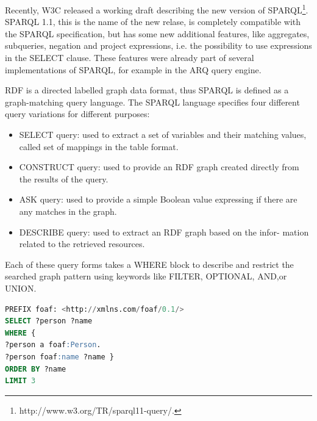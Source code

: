 Recently, W3C released a working draft describing the new version of SPARQL\footnote{http://www.w3.org/TR/sparql11-query/.}. SPARQL 1.1, this is the name of the new relase, is completely compatible with the SPARQL specification, but has some new additional features, like aggregates, subqueries, negation and project expressions, i.e. the possibility to use expressions in the SELECT clause. These features were already part of several implementations of SPARQL, for example in the ARQ query engine. 

RDF is a directed labelled graph data format, thus SPARQL is defined as a graph-matching query language. The SPARQL language specifies four different query variations for different purposes:
\begin{itemize}
\item SELECT query: used to extract a set of variables and their matching values, called set of mappings in the table format.
\item CONSTRUCT query: used to provide an RDF graph created directly from the results of the query.
\item ASK query: used to provide a simple Boolean value expressing if there are any matches in the graph.
\item DESCRIBE query: used to extract an RDF graph based on the infor- mation related to the retrieved resources.
\end{itemize}

Each of these query forms takes a WHERE block to describe and restrict the searched graph pattern using keywords like FILTER, OPTIONAL, AND,or UNION.

\begin{lstlisting}[language=SQL, caption=An example of a simple SPARQL query , keywords={PREFIX,SELECT,WHERE,ORDER,BY, LIMIT }, label=code:sparql]
PREFIX foaf: <http://xmlns.com/foaf/0.1/> 
SELECT ?person ?name
WHERE {
?person a foaf:Person.
?person foaf:name ?name }
ORDER BY ?name 
LIMIT 3
\end{lstlisting}

